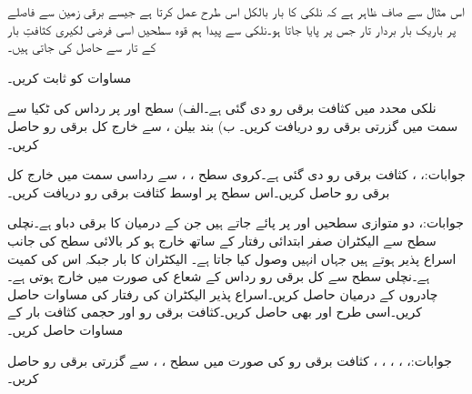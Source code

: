 \begin{itemize}
\end{itemize}

اس مثال سے صاف ظاہر ہے کہ نلکی کا بار بالکل اس طرح عمل کرتا ہے جیسے برقی زمین سے   فاصلے پر باریک بار بردار تار جس پر   پایا جاتا ہو۔نلکی سے پیدا ہم قوہ سطحیں اسی فرضی لکیری کثافتِ بار کے تار سے حاصل کی جاتی ہیں۔

مساوات  کو ثابت کریں۔
\newpage



نلکی محدد میں کثافت برقی رو  دی گئی ہے۔الف) سطح  اور  پر رداس  کی ٹکیا سے  سمت میں گزرتی برقی رو دریافت کریں۔ ب) بند بیلن ،  سے خارج کل برقی رو حاصل کریں۔

جوابات:، ، 
کثافت برقی رو  دی گئی ہے۔کروی سطح ، ،  سے رداسی سمت میں خارج کل برقی رو حاصل کریں۔اس سطح پر اوسط کثافت برقی رو دریافت کریں۔

جوابات:، 
دو متوازی سطحیں  اور  پر پائے جاتے ہیں جن کے درمیان  کا برقی دباو ہے۔نچلی سطح سے الیکٹران صفر ابتدائی رفتار کے ساتھ خارج ہو کر بالائی سطح کی جانب اسراع پذیر ہوتے ہیں جہاں انہیں وصول کیا جاتا ہے۔ الیکٹران کا بار  جبکہ اس کی کمیت  ہے۔نچلی سطح سے کل  برقی رو  رداس کے شعاع کی صورت میں خارج ہوتی ہے۔چادروں کے درمیان  حاصل کریں۔اسراع پذیر الیکٹران کی رفتار  کی مساوات حاصل کریں۔اسی طرح  اور  بھی حاصل کریں۔کثافت برقی رو اور حجمی کثافت بار کے مساوات حاصل کریں۔

جوابات:، ، ، ، ،  
کثافت برقی رو  کی صورت میں سطح ،  ، سے گزرتی برقی رو حاصل کریں۔

